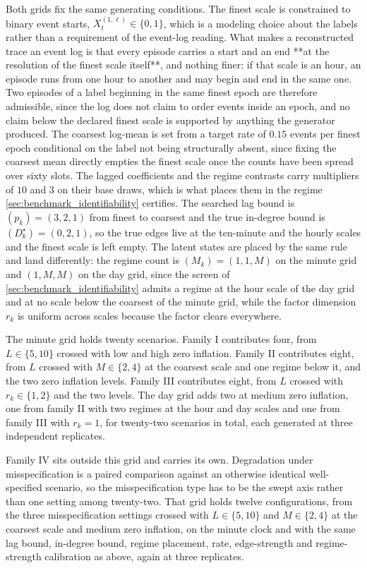Both grids fix the same generating conditions. The finest scale is constrained
to binary event starts, \(X_t^{(1,\ell)} \in \{0,1\}\), which is a modeling
choice about the labels rather than a requirement of the event-log reading. What
makes a reconstructed trace an event log is that every episode carries a start
and an end **at the resolution of the finest scale itself**, and nothing finer:
if that scale is an hour, an episode runs from one hour to another and may begin
and end in the same one. Two episodes of a label beginning in the same finest
epoch are therefore admissible, since the log does not claim to order events
inside an epoch, and no claim below the declared finest scale is supported by
anything the generator produced. The
coarsest log-mean is set from a target rate of \(0.15\) events per finest epoch
conditional on the label not being structurally absent, since fixing the
coarsest mean directly empties the finest scale once the counts have been
spread over sixty slots. The lagged coefficients and the regime contrasts carry
multipliers of \(10\) and \(3\) on their base draws, which is what places them
in the regime \cref{sec:benchmark_identifiability} certifies. The searched lag
bound is \((p_k) = (3,2,1)\) from finest to coarsest and the true in-degree
bound is \((D_k^\star) = (0,2,1)\), so the true edges live at the ten-minute
and the hourly scales and the finest scale is left empty. The latent states are
placed by the same rule and land differently: the regime count is
\((M_k) = (1,1,M)\) on the minute grid and \((1,M,M)\) on the day grid, since
the screen of \cref{sec:benchmark_identifiability} admits a regime at the hour
scale of the day grid and at no scale below the coarsest of the minute grid,
while the factor dimension \(r_k\) is uniform across scales because the factor
clears everywhere.

The minute grid holds twenty scenarios. Family I contributes four, from
\(L \in \{5,10\}\) crossed with low and high zero inflation. Family II
contributes eight, from \(L\) crossed with \(M \in \{2,4\}\) at the coarsest
scale and one regime below it, and the two zero inflation levels. Family III contributes eight, from
\(L\) crossed with \(r_k \in \{1,2\}\) and the two levels. The day grid adds
two at medium zero inflation, one from family II with two regimes at the hour
and day scales and one from family III with \(r_k = 1\), for twenty-two
scenarios in total, each generated
at three independent replicates.

Family IV sits outside this grid and carries its own. Degradation under
misspecification is a paired comparison against an otherwise identical
well-specified scenario, so the misspecification type has to be the swept axis
rather than one setting among twenty-two. That grid holds twelve
configurations, from the three misspecification settings crossed with
\(L \in \{5,10\}\) and \(M \in \{2,4\}\) at the coarsest scale and medium zero
inflation, on the minute clock and with the same lag bound, in-degree bound,
regime placement, rate, edge-strength and regime-strength calibration as above,
again at three replicates.

